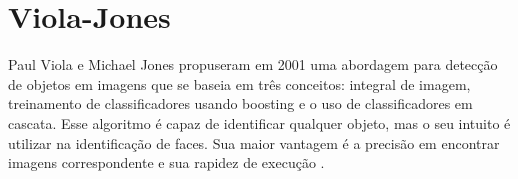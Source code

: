 \section{Viola-Jones}\label{sec:viola-jones}

Paul Viola e Michael Jones propuseram em 2001 uma abordagem para
detecção de objetos em imagens que se baseia em três conceitos: integral de imagem,
treinamento de classificadores usando boosting e o uso de classificadores em cascata.
Esse algoritmo é capaz de identificar qualquer objeto, mas o seu intuito é utilizar na identificação de faces. Sua maior vantagem é a precisão em encontrar imagens correspondente e sua rapidez de execução \cite{refer4}.
